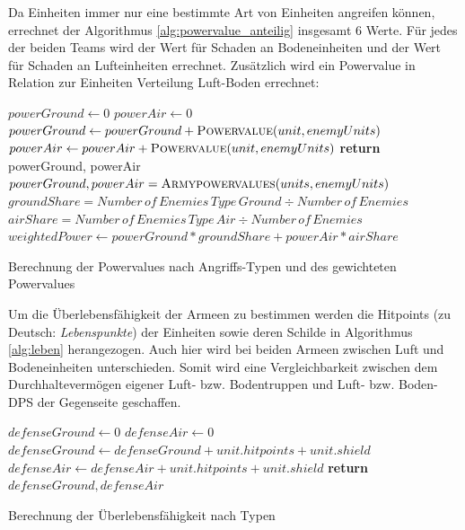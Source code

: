 Da Einheiten immer nur eine bestimmte Art von Einheiten angreifen können, errechnet der Algorithmus \ref{alg:powervalue_anteilig} insgesamt 6 Werte. Für jedes der beiden Teams wird der Wert für Schaden an Bodeneinheiten und der Wert für Schaden an Lufteinheiten errechnet. Zusätzlich wird ein Powervalue in Relation zur Einheiten Verteilung Luft-Boden errechnet:
\begin{algorithm}
\begin{algorithmic}[1]
	\State $powerGround \leftarrow 0$
	\State $powerAir \leftarrow 0$
		\State $powerGround \leftarrow powerGround+\textsc{Powervalue}(unit, enemyUnits)$	
		\Else
			\State $powerAir \leftarrow powerAir+\textsc{Powervalue}(unit, enemyUnits)$	
		\EndIf	
	\EndFor
\State \textbf{return} powerGround, powerAir
\EndProcedure	
\State $powerGround, powerAir = \textsc{Armypowervalues}(units, enemyUnits)$
\State $groundShare = Number\,of\,Enemies\,Type\,Ground \div Number\,of\,Enemies$
\State $airShare = Number\,of\,Enemies\,Type\,Air \div Number\,of\,Enemies$
\State $weightedPower \leftarrow powerGround * groundShare + powerAir * airShare$ 
\end{algorithmic}
\caption{Berechnung der Powervalues nach Angriffs-Typen und des gewichteten Powervalues}
\label{alg:powervalue_anteilig}
\end{algorithm}



Um die Überlebensfähigkeit der Armeen zu bestimmen werden die Hitpoints (zu Deutsch: \textit{Lebenspunkte}) der Einheiten sowie deren Schilde in Algorithmus \ref{alg:leben} herangezogen. Auch hier wird bei beiden Armeen zwischen Luft und Bodeneinheiten unterschieden. Somit wird eine Vergleichbarkeit zwischen dem Durchhaltevermögen eigener Luft- bzw. Bodentruppen und Luft- bzw. Boden-DPS der Gegenseite geschaffen.

\begin{algorithm}[ht]
\begin{algorithmic}[1]
	\State $defenseGround \leftarrow 0$
	\State $defenseAir \leftarrow 0$
			\State $defenseGround \leftarrow defenseGround + unit.hitpoints + unit.shield$
		\EndIf
			\State $defenseAir \leftarrow defenseAir + unit.hitpoints + unit.shield$
		\EndIf
	\EndFor 
	\State \textbf{return} $defenseGround, defenseAir$
\EndProcedure
\end{algorithmic}
\caption{Berechnung der Überlebensfähigkeit nach Typen}
\label{alg:leben}
\end{algorithm}

